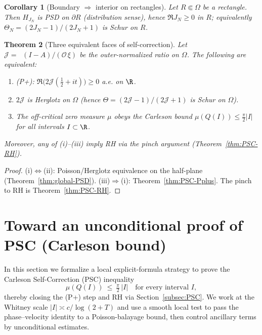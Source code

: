 \documentclass[11pt]{article}
\newtheorem{theorem}{Theorem}
\newtheorem{corollary}[theorem]{Corollary}
\theoremstyle{remark}
\DeclareMathOperator{\dettwo}{det_2}
\begin{document}
\begin{corollary}[Boundary $\Rightarrow$ interior on rectangles]\label{cor:bdry-to-int}
Let $R\Subset\Omega$ be a rectangle. Then $H_{J_N}$ is PSD on $\partial R$ (distribution sense), hence $\Re J_N\ge 0$ in $R$; equivalently $\Theta_N=(2J_N-1)/(2J_N+1)$ is Schur on $R$.
\end{corollary}

\begin{theorem}[Three equivalent faces of self-correction]\label{thm:SC-equivalences}
Let $\mathcal J=\dettwo(I-A)/(\mathcal O\,\xi)$ be the outer-normalized ratio on $\Omega$. The following are equivalent:
\begin{enumerate}
\item[\textup{(i)}] \textup{(P+)}: $\Re\bigl(2\mathcal J(\tfrac12+it)\bigr)\ge 0$ a.e. on $\R$.
\item[\textup{(ii)}] $2\mathcal J$ is Herglotz on $\Omega$ (hence $\Theta=(2\mathcal J-1)/(2\mathcal J+1)$ is Schur on $\Omega$).
\item[\textup{(iii)}] The off-critical zero measure $\mu$ obeys the Carleson bound $\mu(Q(I))\le \tfrac{\pi}{2}|I|$ for all intervals $I\subset\R$.
\end{enumerate}
Moreover, any of (i)–(iii) imply RH via the pinch argument (Theorem~\ref{thm:PSC-RH}).
\end{theorem}
\begin{proof}
(i)$\Leftrightarrow$(ii): Poisson/Herglotz equivalence on the half-plane (Theorem~\ref{thm:global-PSD}). (iii)$\Rightarrow$(i): Theorem~\ref{thm:PSC-Pplus}. The pinch to RH is Theorem~\ref{thm:PSC-RH}.
\end{proof}


\section{Toward an unconditional proof of PSC (Carleson bound)}\label{sec:unconditional-psc-proof}
In this section we formalize a local explicit-formula strategy to prove the Carleson Self-Correction (PSC) inequality
\[ \mu(Q(I))\ \le\ \tfrac{\pi}{2}\,|I| \quad\text{for every interval } I, \]
thereby closing the (P+) step and RH via Section~\ref{subsec:PSC}. We work at the Whitney scale \(|I|\asymp c/\log(2+T)\) and use a smooth local test to pass the phase--velocity identity to a Poisson-balayage bound, then control ancillary terms by unconditional estimates.
\end{document}
